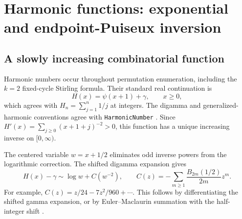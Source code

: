 \documentclass[11pt,a4paper]{article}
\numberwithin{equation}{section}
\theoremstyle{definition}
\theoremstyle{remark}
\begin{document}
\section{Harmonic functions: exponential and endpoint-Puiseux inversion}
\label{sec:harmonic}

\subsection{A slowly increasing combinatorial function}

Harmonic numbers occur throughout permutation enumeration, including the $k=2$ fixed-cycle Stirling formula. Their standard real continuation is
\begin{equation}
 H(x)=\psi(x+1)+\gamma,\qquad x\ge0,
 \label{eq:harmonic-cont}
\end{equation}
which agrees with $H_n=\sum_{j=1}^n1/j$ at integers. The digamma and generalized-harmonic conventions agree with \texttt{HarmonicNumber} \cite{wlharmonic}. Since
$H'(x)=\sum_{j\ge0}(x+1+j)^{-2}>0$, this function has a unique increasing inverse on $[0,\infty)$.

The centered variable $w=x+1/2$ eliminates odd inverse powers from the logarithmic correction. The shifted digamma expansion gives
\begin{equation}
 H(x)-\gamma\sim\log w+C(w^{-2}),\qquad
 C(z)=-\sum_{m\ge1}\frac{B_{2m}(1/2)}{2m}z^m.
 \label{eq:harmonic-centered}
\end{equation}
For example, $C(z)=z/24-7z^2/960+\cdots$. This follows by differentiating the shifted gamma expansion, or by Euler--Maclaurin summation with the half-integer shift \cite{dlmfgamma,dlmfbernoulli}.
\end{document}
